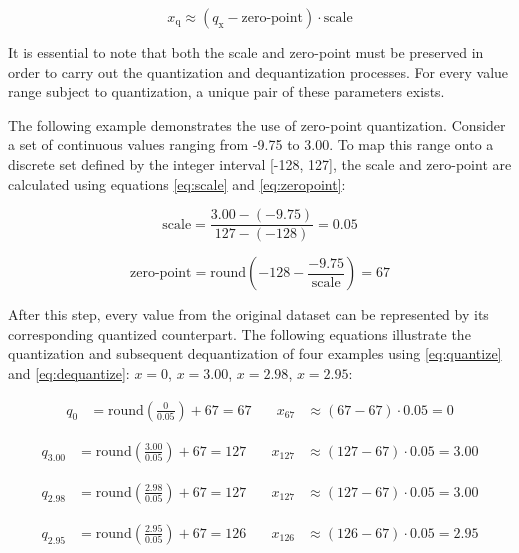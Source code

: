{\begin{equation}
x_{\text{q}} \approx \left( q_{\text{x}} - \text{zero-point} \right) \cdot \text{scale}
\label{eq:dequantize}
\end{equation}

It is essential to note that both the scale and zero-point must be preserved in order to carry out the quantization and dequantization processes. For every value range subject to quantization, a unique pair of these parameters exists.

The following example demonstrates the use of zero-point quantization. Consider a set of continuous values ranging from -9.75 to 3.00. To map this range onto a discrete set defined by the integer interval [-128, 127], the scale and zero-point are calculated using equations \ref{eq:scale} and \ref{eq:zeropoint}:

\begin{equation*}
\text{scale} = \frac{3.00 - (-9.75)}{127 - (-128)} = 0.05
\end{equation*}

\begin{equation*}
\text{zero-point} = \text{round}\left( -128 - \frac{-9.75}{\text{scale}} \right) = 67
\end{equation*}


After this step, every value from the original dataset can be represented by its corresponding quantized counterpart. The following equations illustrate the quantization and subsequent dequantization of four examples using \ref{eq:quantize} and \ref{eq:dequantize}: \( x = 0 \), \( x = 3.00 \), \( x = 2.98 \), \( x = 2.95 \):

\begin{align*}
q_{0} &= \text{round}\left(\frac{0}{0.05} \right) + 67 = 67
& \quad
x_{67} &\approx \left( 67 - 67 \right) \cdot 0.05 = 0
\end{align*}

\begin{align*}
q_{3.00} &= \text{round}\left(\frac{3.00}{0.05} \right) + 67 = 127
& \quad
x_{127} &\approx \left( 127 - 67 \right) \cdot 0.05 = 3.00
\end{align*}

\begin{align*}
q_{2.98} &= \text{round}\left(\frac{2.98}{0.05} \right) + 67 = 127
& \quad
x_{127} &\approx \left( 127 - 67 \right) \cdot 0.05 = 3.00
\end{align*}

\begin{align*}
q_{2.95} &= \text{round}\left(\frac{2.95}{0.05} \right) + 67 = 126
& \quad
x_{126} &\approx \left( 126 - 67 \right) \cdot 0.05 = 2.95
\end{align*}

}
